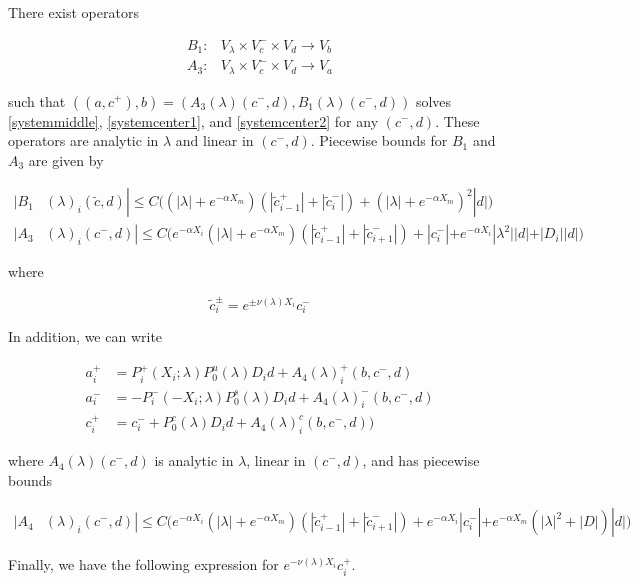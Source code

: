 \documentclass[thesis.tex]{subfiles}
\begin{document}
\begin{lemma}\label{inv2}
There exist operators

\begin{align*}
B_1: &V_\lambda \times V_c^- \times V_d \rightarrow V_b \\
A_3: &V_\lambda \times V_c^- \times V_d \rightarrow V_a 
\end{align*}

such that $( (a, c^+) , b ) = ( A_3(\lambda)(c^-,d), B_1(\lambda)(c^-, d) )$ solves \eqref{systemmiddle}, \eqref{systemcenter1}, and \eqref{systemcenter2} for any $(c^-, d)$. These operators are analytic in $\lambda$ and linear in $(c^-,d)$. Piecewise bounds for $B_1$ and $A_3$ are given by

\begin{align}
|B_1&(\lambda)_i(\tilde{c}, d)| \leq C \Big( (|\lambda| + e^{-\alpha X_m})(|\tilde{c}_{i-1}^+| + |\tilde{c}_i^-|)+ (|\lambda| + e^{-\alpha X_m})^2 |d| \Big) \\
|A_3&(\lambda)_i(c^-, d)|
\leq C \Big(  
e^{-\alpha X_i} (|\lambda| + e^{-\alpha X_m})(|\tilde{c}_{i-1}^+| + |\tilde{c}_{i+1}^-|) +|c_i^-| + e^{-\alpha X_i} |\lambda^2||d| + |D_i||d| \Big)
\end{align} 

where

\begin{equation}\label{tildec}
\tilde{c}_i^\pm = e^{\pm \nu(\lambda) X_i} c_i^-
\end{equation}

In addition, we can write

\begin{align*}
a_i^+ &= P_i^+(X_i; \lambda) P_0^u(\lambda) D_i d + A_4(\lambda)_i^+(b, c^-, d) \\
a_i^- &= -P_i^-(-X_i; \lambda) P_0^s(\lambda) D_i d + A_4(\lambda)_i^-(b, c^-, d) \\
c_i^+ &= c_i^- + P_0^c(\lambda) D_i d + A_4(\lambda)_i^c(b, c^-, d) )
\end{align*}

where $A_4(\lambda)(c^-, d)$ is analytic in $\lambda$, linear in $(c^-, d)$, and has piecewise bounds

\begin{align}
|A_4&(\lambda)_i(c^-, d)|
\leq C \Big( 
e^{-\alpha X_i} (|\lambda| + e^{-\alpha X_m})(|\tilde{c}_{i-1}^+| + |\tilde{c}_{i+1}^-|) + e^{-\alpha X_i} |c_i^-| + e^{-\alpha X_m}(|\lambda|^2 + |D|)|d| \Big)
\end{align}

Finally, we have the following expression for $e^{-\nu(\lambda)X_i} c_i^+$.


\end{lemma}
\end{document}

